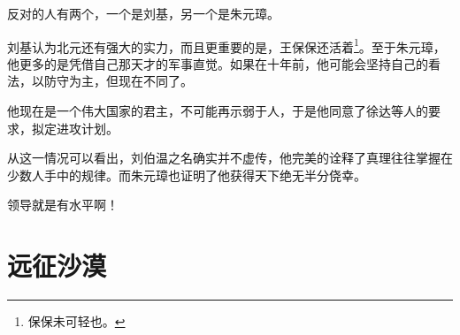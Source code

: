\begin{multicols}{\theparacolNo}
		反对的人有两个，一个是刘基，另一个是朱元璋。

		刘基认为北元还有强大的实力，而且更重要的是，王保保还活着\footnote{保保未可轻也。}。至于朱元璋，他更多的是凭借自己那天才的军事直觉。如果在十年前，他可能会坚持自己的看法，以防守为主，但现在不同了。

		他现在是一个伟大国家的君主，不可能再示弱于人，于是他同意了徐达等人的要求，拟定进攻计划。

		从这一情况可以看出，刘伯温之名确实并不虚传，他完美的诠释了真理往往掌握在少数人手中的规律。而朱元璋也证明了他获得天下绝无半分侥幸。

		领导就是有水平啊！
		\ifnum{}
	\end{multicols}
\fi
\newpage
\section{远征沙漠}
\ifnum{}
